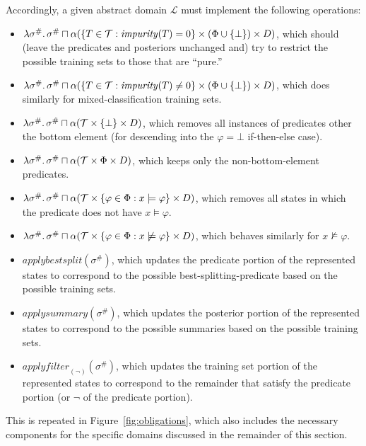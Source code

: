 Accordingly, a given abstract domain $\mathcal{L}$ must implement the following operations:
\begin{itemize}
    \item $\lambda \sigma^\# \ldotp \sigma^\# \sqcap
        \alpha(\{T \in \mathcal{T} : \mathit{impurity}(T) = 0\} \times (\Phi \cup \{\bot\}) \times D)$,
        which should (leave the predicates and posteriors unchanged and)
        try to restrict the possible training sets to those that are ``pure.''
    \item $\lambda \sigma^\# \ldotp \sigma^\# \sqcap
        \alpha(\{T \in \mathcal{T} : \mathit{impurity}(T) \neq 0\} \times (\Phi \cup \{\bot\}) \times D)$,
        which does similarly for mixed-classification training sets.
    \item $\lambda \sigma^\# \ldotp \sigma^\# \sqcap
        \alpha(\mathcal{T} \times \{\bot\} \times D)$,
        which removes all instances of predicates other the bottom element
        (for descending into the $\varphi = \bot$ if-then-else case).
    \item $\lambda \sigma^\# \ldotp \sigma^\# \sqcap
        \alpha(\mathcal{T} \times \Phi \times D)$,
        which keeps only the non-bottom-element predicates.
    \item $\lambda \sigma^\# \ldotp \sigma^\# \sqcap
        \alpha(\mathcal{T} \times \{\varphi \in \Phi : x \models \varphi\} \times D)$,
        which removes all states in which the predicate does not have $x \models \varphi$.
    \item $\lambda \sigma^\# \ldotp \sigma^\# \sqcap
        \alpha(\mathcal{T} \times \{\varphi \in \Phi : x \not\models \varphi\} \times D)$,
        which behaves similarly for $x \not\models \varphi$.
    \item $\mathit{applybestsplit}(\sigma^\#)$,
        which updates the predicate portion of the represented states
        to correspond to the possible best-splitting-predicate
        based on the possible training sets.
    \item $\mathit{applysummary}(\sigma^\#)$,
        which updates the posterior portion of the represented states
        to correspond to the possible summaries
        based on the possible training sets.
    \item $\mathit{applyfilter}_{(\lnot)}(\sigma^\#)$,
        which updates the training set portion of the represented states
        to correspond to the remainder that satisfy the predicate portion
        (or $\lnot$ of the predicate portion).
\end{itemize}
This is repeated in Figure~\ref{fig:obligations},
which also includes the necessary components for the
specific domains discussed in the remainder of this section.

